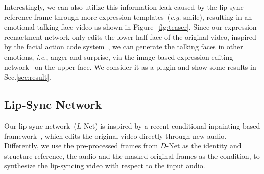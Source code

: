 Interestingly, we can also utilize this information leak caused by the lip-sync reference frame through more expression templates~(\emph{e.g.} smile), resulting in an emotional talking-face video as shown in Figure~\ref{fig:teaser}. Since our expression reenactment network only edits the lower-half face of the original video, inspired by the facial action code system~\cite{facs}, we can generate the talking faces in other emotions, \emph{i.e.}, anger and surprise, via the image-based expression editing network~\cite{ganimation} on the upper face.  We consider it as a plugin and show some results in Sec.\ref{sec:result}.











\subsection{Lip-Sync Network}
\label{sec:lipsyncnet}
Our lip-sync network~($L$-Net) is inspired by a recent conditional inpainting-based framework~\cite{wav2lip}, which edits the original video directly through new audio. 
Differently, we use the pre-processed frames from ${D}$-Net as the identity and structure reference, the audio and the masked original frames as the condition, to synthesize the lip-syncing video with respect to the input audio. 


